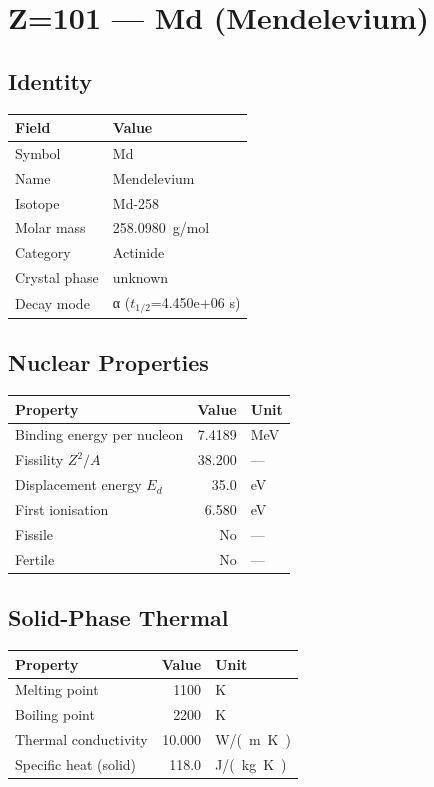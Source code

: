 \documentclass[11pt,a4paper]{article}
\begin{document}
\newpage

\section{Z=101 --- Md (Mendelevium)}
\label{sec:Z101}

\subsection{Identity}
\begin{tabular}{ll}
  \toprule
  Field & Value \\
  \midrule
  Symbol & Md \\
  Name & Mendelevium \\
  Isotope & Md-258 \\
  Molar mass & \SI{258.0980}{g/mol} \\
  Category & Actinide \\
  Crystal phase & unknown \\
  Decay mode & α ($t_{1/2}$=4.450e+06 s) \\
  \bottomrule
\end{tabular}

\subsection{Nuclear Properties}
\begin{tabular}{lrl}
  \toprule
  Property & Value & Unit \\
  \midrule
  Binding energy per nucleon & 7.4189 & \si{MeV} \\
  Fissility $Z^2/A$ & 38.200 & --- \\
  Displacement energy $E_d$ & 35.0 & \si{eV} \\
  First ionisation & 6.580 & \si{eV} \\
  Fissile & No & --- \\
  Fertile & No & --- \\
  \bottomrule
\end{tabular}

\subsection{Solid-Phase Thermal}
\begin{tabular}{lrl}
  \toprule
  Property & Value & Unit \\
  \midrule
  Melting point & 1100 & \si{K} \\
  Boiling point & 2200 & \si{K} \\
  Thermal conductivity & 10.000 & \si{W/(m.K)} \\
  Specific heat (solid) & 118.0 & \si{J/(kg.K)} \\
  \bottomrule
\end{tabular}
\end{document}
